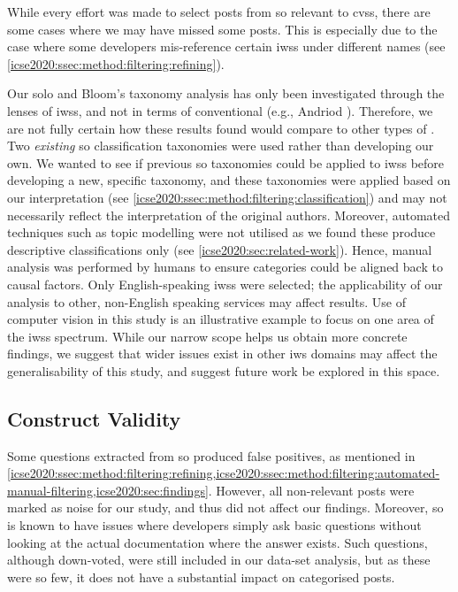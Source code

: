While every effort was made to select posts from \gls{so} relevant to \glspl{cvs}, there are some cases where we may have missed some posts. This is especially due to the case where some developers mis-reference certain \glspl{iws} under different names (see \cref{icse2020:ssec:method:filtering:refining}).

%
Our \gls{solo} and Bloom's taxonomy analysis has only been investigated through the lenses of \glspl{iws}, and not in terms of conventional  (e.g., Andriod ). Therefore, we are not fully certain how these results found would compare to other types of . %
%
Two \textit{existing} \gls{so} classification taxonomies were used rather than developing our own. We wanted to see if previous \gls{so} taxonomies could be applied to \glspl{iws} before developing a new, specific taxonomy, and these taxonomies were applied based on our interpretation  (see \cref{icse2020:ssec:method:filtering:classification}) and may not necessarily reflect the interpretation of the original authors. Moreover, automated techniques such as topic modelling were not utilised as we found these produce descriptive classifications only (see \cref{icse2020:sec:related-work}). Hence, manual analysis was performed by humans to ensure categories could be aligned back to causal factors.
%
Only English-speaking \glspl{iws} were selected; the applicability of our analysis to other, non-English speaking services may affect results.
%
Use of computer vision in this study is an illustrative example to focus on one area of the \glspl{iws} spectrum. While our narrow scope helps us obtain more concrete findings, we suggest that wider issues exist in other \gls{iws} domains may affect the generalisability of this study, and suggest future work be explored in this space.

\subsection{Construct Validity}

Some questions extracted from \gls{so} produced false positives, as mentioned in \cref{icse2020:ssec:method:filtering:refining,icse2020:ssec:method:filtering:automated-manual-filtering,icse2020:sec:findings}. However, all non-relevant posts were marked as noise for our study, and thus did not affect our findings.
%
Moreover, \gls{so} is known to have issues where developers simply ask basic questions without looking at the actual documentation where the answer exists. Such questions, although down-voted, were still included in our data-set analysis, but as these were \gls{so} few, it does not have a substantial impact on categorised posts.

